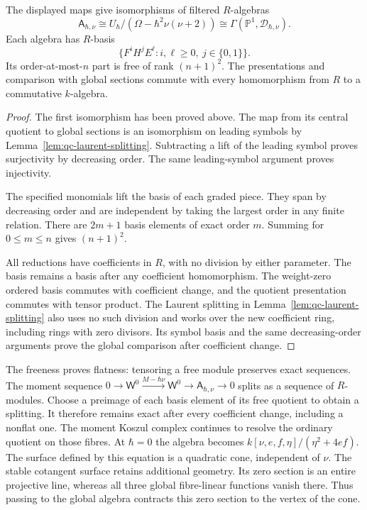 \begin{theorem}\label{thm:qc-global-algebra}
The displayed maps give isomorphisms of filtered $R$-algebras
\[
 \mathsf A_{\hbar,\nu}
 \cong U_\hbar/(\Omega-\hbar^2\nu(\nu+2))
 \cong\Gamma(\mathbb P^1,\mathcal D_{\hbar,\nu}).
\]
Each algebra has $R$-basis
\[
 \{F^iH^jE^\ell:i,\ell\ge0,\ j\in\{0,1\}\}.
\]
Its order-at-most-$n$ part is free of rank $(n+1)^2$.
The presentations and comparison with global sections commute with every homomorphism from $R$ to a commutative $k$-algebra.
\end{theorem}
\begin{proof}
The first isomorphism has been proved above.
The map from its central quotient to global sections is an isomorphism on leading symbols by Lemma~\ref{lem:qc-laurent-splitting}.
Subtracting a lift of the leading symbol proves surjectivity by decreasing order.
The same leading-symbol argument proves injectivity.

The specified monomials lift the basis of each graded piece.
They span by decreasing order and are independent by taking the largest order in any finite relation.
There are $2m+1$ basis elements of exact order $m$.
Summing for $0\le m\le n$ gives $(n+1)^2$.

All reductions have coefficients in $R$, with no division by either parameter.
The basis remains a basis after any coefficient homomorphism.
The weight-zero ordered basis commutes with coefficient change, and the quotient presentation commutes with tensor product.
The Laurent splitting in Lemma~\ref{lem:qc-laurent-splitting} also uses no such division and works over the new coefficient ring, including rings with zero divisors.
Its symbol basis and the same decreasing-order arguments prove the global comparison after coefficient change.
\end{proof}

The freeness proves flatness: tensoring a free module preserves exact sequences.
The moment sequence $0\to\mathsf W^0\xrightarrow{M-\hbar\nu}\mathsf W^0\to\mathsf A_{\hbar,\nu}\to0$ splits as a sequence of $R$-modules.
Choose a preimage of each basis element of its free quotient to obtain a splitting.
It therefore remains exact after every coefficient change, including a nonflat one.
The moment Koszul complex continues to resolve the ordinary quotient on those fibres.
At $\hbar=0$ the algebra becomes $k[\nu,e,f,\eta]/(\eta^2+4ef)$.
The surface defined by this equation is a quadratic cone, independent of $\nu$.
The stable cotangent surface retains additional geometry.
Its zero section is an entire projective line, whereas all three global fibre-linear functions vanish there.
Thus passing to the global algebra contracts this zero section to the vertex of the cone.

